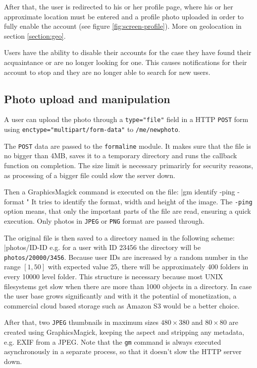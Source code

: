 \documentclass[12pt,oneside]{fithesis}
\begin{document}
	  After that, the user is redirected to his or her profile page, where his or her approximate location must be entered and a profile photo uploaded in order to fully enable the account (see figure \ref{fig:screen-profile}). More on geolocation in section \ref{section:geo}.
	  
	  Users have the ability to disable their accounts for the case they have found their acquaintance or are no longer looking for one. This causes notifications for their account to stop and they are no longer able to search for new users.
	\subsection{Photo upload and manipulation}
		A user can upload the photo through a \texttt{type="file"} field in a HTTP \texttt{POST} form using \texttt{enctype="multipart/form-data"} to \texttt{/me/newphoto}.
		
		The \texttt{POST} data are passed to the \texttt{formaline} module. It makes sure that the file is no bigger than 4MB, saves it to a temporary directory and runs the callback function on completion. The size limit is necessary primarirly for security reasons, as processing of a bigger file could slow the server down.
		
		Then a GraphicsMagick command is executed on the file:
		|gm identify -ping -format "%
		It tries to identify the format, width and height of the image. The \texttt{-ping} option means, that only the important parts of the file are read, ensuring a quick execution. Only photos in \texttt{JPEG} or \texttt{PNG} format are passed through.
		
		The original file is then saved to a directory named in the following scheme: 
		|photos/ID-ID%
		e.g. for a user with ID 23456 the directory will be \texttt{photos/20000/3456}. Because user IDs are increased by a random number in the range $\left[1,50\right]$ with expected value 25, there will be approximately 400 folders in every 10000 level folder. This structure is necessary because most UNIX filesystems get slow when there are more than 1000 objects in a directory. In case the user base grows significantly and with it the potential of monetization, a commercial cloud based storage such as Amazon S3 would be a better choice.
		
		After that, two \texttt{JPEG} thumbnails in maximum sizes $480\times 380$ and $80\times 80$ are created using GraphicsMagick, keeping the aspect and stripping any metadata, e.g. EXIF from a JPEG. Note that the \texttt{gm} command is always executed asynchronously in a separate process, so that it doesn't slow the HTTP server down.
		
\end{document}
